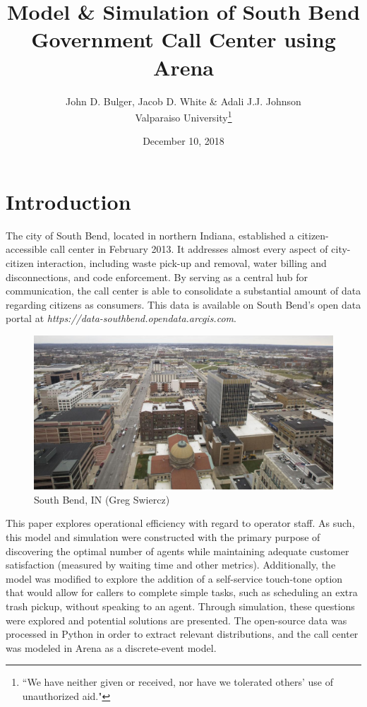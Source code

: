 \documentclass[12pt,twocolumn]{article}
\title{Model \& Simulation of South Bend Government Call Center using Arena}
\author{John D. Bulger, Jacob D. White \& Adali J.J. Johnson\\Valparaiso University\thanks{``We have neither given or received, nor have we tolerated others' use of unauthorized aid."}}
\date{December 10, 2018}
\begin{document}
\maketitle

\section{Introduction}
The city of South Bend, located in northern Indiana, established a citizen-accessible call center in February 2013.  It addresses almost every aspect of city-citizen interaction, including waste pick-up and removal, water billing and disconnections, and code enforcement.  By serving as a central hub for communication, the call center is able to consolidate a substantial amount of data regarding citizens as consumers.  This data is available on South Bend's open data portal at \textit{https://data-southbend.opendata.arcgis.com}.

	\begin{figure}[h]
	\includegraphics[scale=.17]{south_bend.png}
	\caption{South Bend, IN (Greg Swiercz)}
	\end{figure}

\par
This paper explores operational efficiency with regard to operator staff.  As such, this model and simulation were constructed with the primary purpose of discovering the optimal number of agents while maintaining adequate customer satisfaction (measured by waiting time and other metrics).  Additionally, the model was modified to explore the addition of a self-service touch-tone option that would allow for callers to complete simple tasks, such as scheduling an extra trash pickup, without speaking to an agent.  Through simulation, these questions were explored and potential solutions are presented.  The open-source data was processed in Python in order to extract relevant distributions, and the call center was modeled in Arena as a discrete-event model.  
\end{document}
